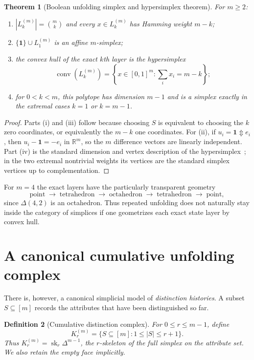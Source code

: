 \documentclass[11pt]{article}
\newtheorem{theorem}{Theorem}[section]
\newtheorem{definition}[theorem]{Definition}
\newcommand{\sk}{\operatorname{sk}}
\newcommand{\Updown}{\mathbin{\Updownarrow}}
\begin{document}
\begin{theorem}[Boolean unfolding simplex and hypersimplex theorem]\label{thm:hypersimplex}
For $m\ge2$:
\begin{enumerate}[label=(\roman*)]
\item $|L_k^{(m)}|=\binom{m}{k}$ and every $x\in L_k^{(m)}$ has Hamming weight $m-k$;
\item $\{\mathbf1\}\cup L_1^{(m)}$ is an affine $m$-simplex;
\item the convex hull of the exact $k$th layer is the hypersimplex
\[
\operatorname{conv}(L_k^{(m)})
=\left\{x\in[0,1]^m:\sum_i x_i=m-k\right\};
\]
\item for $0<k<m$, this polytope has dimension $m-1$ and is a simplex exactly in the extremal cases $k=1$ or $k=m-1$.
\end{enumerate}
\end{theorem}
\begin{proof}
Parts (i) and (iii) follow because choosing $S$ is equivalent to choosing the $k$ zero coordinates, or equivalently the $m-k$ one coordinates.  For (ii), if $u_i=\mathbf1\Updown e_i$, then $u_i-\mathbf1=-e_i$ in $\mathbb R^m$, so the $m$ difference vectors are linearly independent.  Part (iv) is the standard dimension and vertex description of the hypersimplex~\cite{GelfandEtAlHypersimplex}; in the two extremal nontrivial weights its vertices are the standard simplex vertices up to complementation.
\end{proof}

For $m=4$ the exact layers have the particularly transparent geometry
\[
\text{point}\;\longrightarrow\;\text{tetrahedron}\;\longrightarrow\;\text{octahedron}\;\longrightarrow\;\text{tetrahedron}\;\longrightarrow\;\text{point},
\]
since $\Delta(4,2)$ is an octahedron.  Thus repeated unfolding does not naturally stay inside the category of simplices if one geometrizes each exact state layer by convex hull.

\section{A canonical cumulative unfolding complex}

There is, however, a canonical simplicial model of \emph{distinction histories}.  A subset $S\subseteq[m]$ records the attributes that have been distinguished so far.

\begin{definition}[Cumulative distinction complex]
For $0\le r\le m-1$, define
\[
K_r^{(m)}=\{S\subseteq[m]:1\le |S|\le r+1\}.
\]
Thus $K_r^{(m)}=\sk_r\Delta^{m-1}$, the $r$-skeleton of the full simplex on the attribute set.  We also retain the empty face implicitly.
\end{definition}
\end{document}
